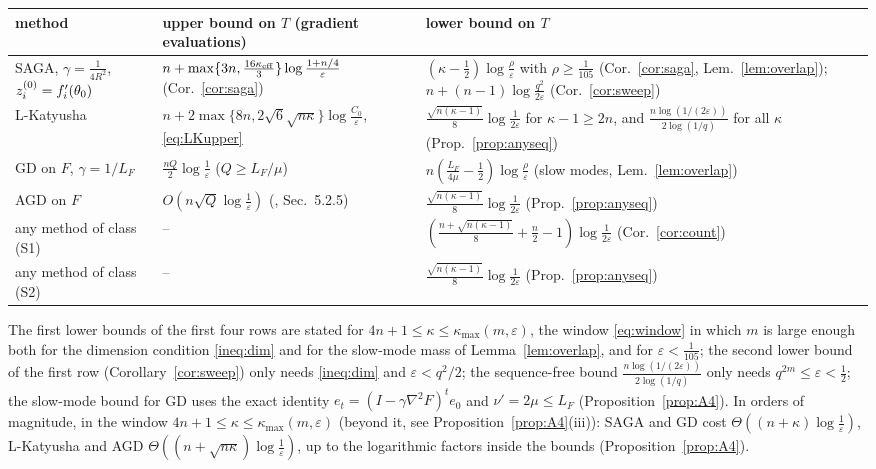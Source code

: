 \begin{center}
\footnotesize
\begin{tabular}{@{}p{3.0cm}p{5.9cm}p{6.6cm}@{}}
\toprule
method & upper bound on $T$ (gradient evaluations) & lower bound on $T$ \\
\midrule
SAGA, $\gamma=\frac1{4R^2}$, $z_i^{(0)}=f'_i(\theta_0)$ & $n+\max\{3n,\frac{16\kappa_{\rm eff}}3\}\log\frac{1+n/4}\varepsilon$ (Cor.~\ref{cor:saga}) & $(\kappa-\frac12)\log\frac\rho\varepsilon$ with $\rho\ge\frac1{105}$ (Cor.~\ref{cor:saga}, Lem.~\ref{lem:overlap}); $n+(n-1)\log\frac{q^2}{2\varepsilon}$ (Cor.~\ref{cor:sweep})\\[2pt]
L-Katyusha & $n+2\max\{8n,2\sqrt6\sqrt{n\kappa}\}\log\frac{C_0}\varepsilon$, \eqref{eq:LKupper} & $\frac{\sqrt{n(\kappa-1)}}8\log\frac1{2\varepsilon}$ for $\kappa-1\ge2n$, and $\frac{n\log(1/(2\varepsilon))}{2\log(1/q)}$ for all $\kappa$ (Prop.~\ref{prop:anyseq})\\[2pt]
GD on $F$, $\gamma=1/L_F$ & $\frac{nQ}2\log\frac1\varepsilon$ ($Q\ge L_F/\mu$) & $n(\frac{L_F}{4\mu}-\frac12)\log\frac\rho\varepsilon$ (slow modes, Lem.~\ref{lem:overlap})\\[2pt]
AGD on $F$ & $O(n\sqrt Q\log\frac1\varepsilon)$ (\cite{bach2024learning}, Sec.~5.2.5) & $\frac{\sqrt{n(\kappa-1)}}8\log\frac1{2\varepsilon}$ (Prop.~\ref{prop:anyseq})\\[2pt]
any method of class (S1) & -- & $(\frac{n+\sqrt{n(\kappa-1)}}8+\frac n2-1)\log\frac1{2\varepsilon}$ (Cor.~\ref{cor:count})\\[2pt]
any method of class (S2) & -- & $\frac{\sqrt{n(\kappa-1)}}8\log\frac1{2\varepsilon}$ (Prop.~\ref{prop:anyseq})\\
\bottomrule
\end{tabular}
\end{center}
The first lower bounds of the first four rows are stated for $4n+1\le\kappa\le\kappa_{\max}(m,\varepsilon)$, the window \eqref{eq:window} in which $m$ is large enough both for the dimension condition \eqref{ineq:dim} and for the slow-mode mass of Lemma~\ref{lem:overlap}, and for $\varepsilon<\frac1{105}$; the second lower bound of the first row (Corollary~\ref{cor:sweep}) only needs \eqref{ineq:dim} and $\varepsilon<q^2/2$; the sequence-free bound $\frac{n\log(1/(2\varepsilon))}{2\log(1/q)}$ only needs $q^{2m}\le\varepsilon<\frac12$; the slow-mode bound for GD uses the exact identity $e_t=(I-\gamma\nabla^2F)^te_0$ and $\nu'=2\mu\le L_F$ (Proposition~\ref{prop:A4}). In orders of magnitude, in the window $4n+1\le\kappa\le\kappa_{\max}(m,\varepsilon)$ (beyond it, see Proposition~\ref{prop:A4}(iii)): SAGA and GD cost $\Theta((n+\kappa)\log\frac1\varepsilon)$, L-Katyusha and AGD $\Theta((n+\sqrt{n\kappa})\log\frac1\varepsilon)$, up to the logarithmic factors inside the bounds (Proposition~\ref{prop:A4}).

